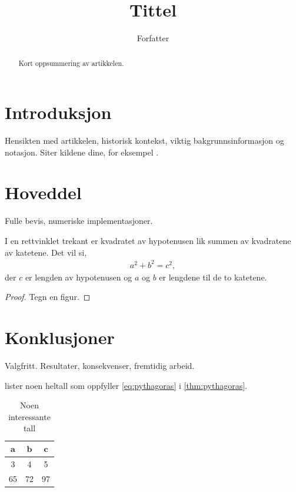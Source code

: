 \documentclass[a4paper, article, oneside, norsk]{memoir} %
\title{Tittel}
\author{Forfatter}
\newcommand{\0}{\mathbf{0}}
\newcommand{\1}{\mathbf{1}}
\begin{document}
\projectfrontpage


\begin{abstract}
    \noindent
    Kort oppsummering av artikkelen.
\end{abstract}


\chapter{Introduksjon}


Hensikten med artikkelen, historisk kontekst, viktig bakgrunnsinformasjon og notasjon.
Siter kildene dine,
for eksempel \cite{Hel17}.


\chapter{Hoveddel}


Fulle bevis, numeriske implementasjoner.

\begin{teorem}[Pythagoras]
    \label{thm:pythagoras}
    I en rettvinklet trekant er kvadratet av hypotenusen lik summen av kvadratene av katetene.
    Det vil si,
    \begin{align}
        \label{eq:pythagoras}
            a^2 + b^2 = c^2,
    \end{align}
    der \(c\) er lengden av hypotenusen og \(a\) og \(b\) er lengdene til de to katetene.
\end{teorem}

\begin{proof}
    Tegn en figur.
\end{proof}


\chapter{Konklusjoner}


Valgfritt. Resultater, konsekvenser, fremtidig arbeid.

 lister noen heltall som oppfyller \cref{eq:pythagoras} i \cref{thm:pythagoras}.

\begin{table}[htbp]
    \centering
    \begin{tabular}{@{}ccc@{}}
        \toprule
        \(\boldsymbol{a}\) & \(\boldsymbol{b}\) & \(\boldsymbol{c}\)
        \\
        \midrule
        3 & 4 & 5
        \\
        65 & 72 & 97
        \\
        \bottomrule
    \end{tabular}
    \caption{Noen interessante tall}
    \label{tab:tall}
\end{table}


\printbibliography
\end{document}
